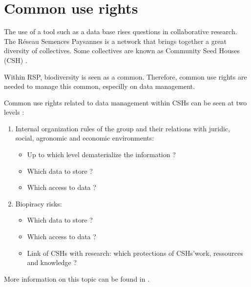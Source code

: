 \section{Common use rights}

The use of a tool such as a data base rises questions in collaborative research.
The R\'eseau Semences Paysannes is a network that brings together a great diversity of collectives.
Some collectives are known as Community Seed Houses (CSH) \citep{rsp_msp_2014}.

Within RSP, biodiversity is seen as a common.
Therefore, common use rights are needed to manage this common, especilly on data management.

Common use rights related to data management within CSHs can be seen at two levels :

\begin{enumerate}

\item Internal organization rules of the group and their relations with juridic, social, agronomic and economic environments:
	\begin{itemize}
	\item Up to which level dematerialize the information ?
	\item Which data to store ?
	\item Which access to data ?
	\end{itemize}

\item Biopiracy risks:
	\begin{itemize}
	\item Which data to store ?
	\item Which access to data ?
	\item Link of CSHs with research: which protections of CSHs'work, ressources and knowledge ?
	\end{itemize}

\end{enumerate}

More information on this topic can be found in \citet{rsp_element_2015}.



